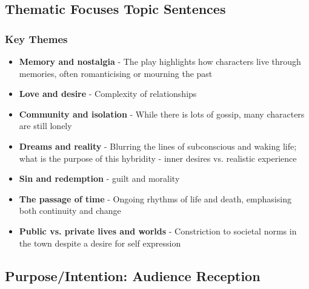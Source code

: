 	\subsection{Thematic Focuses Topic Sentences}
	
		\subsubsection{Key Themes}
		
			\begin{itemize}
				\item \textbf{Memory and nostalgia} - The play highlights how characters live through memories, often romanticising or mourning the past
				\item \textbf{Love and desire} - Complexity of relationships
				\item \textbf{Community and isolation} - While there is lots of gossip, many characters are still lonely
				\item \textbf{Dreams and reality} - Blurring the lines of subconscious and waking life; what is the purpose of this hybridity - inner desires vs. realistic experience
				\item \textbf{Sin and redemption} - guilt and morality
				\item \textbf{The passage of time} - Ongoing rhythms of life and death, emphasising both continuity and change
				\item \textbf{Public vs. private lives and worlds} - Constriction to societal norms in the town despite a desire for self expression
			\end{itemize}

	\subsection{Purpose/Intention: Audience Reception}
		

